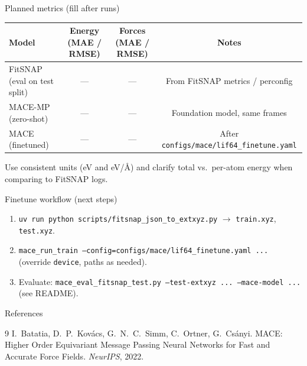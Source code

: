 \documentclass[aspectratio=169]{beamer}
\begin{document}
\begin{frame}{Planned metrics (fill after runs)}
  \begin{table}
    \centering
    \small
    \begin{tabular}{@{}lccc@{}}
      \toprule
      Model & Energy (MAE / RMSE) & Forces (MAE / RMSE) & Notes \\
      \midrule
      FitSNAP (eval on test split) & --- & --- & From FitSNAP metrics / perconfig \\
      MACE-MP (zero-shot) & --- & --- & Foundation model, same frames \\
      MACE (finetuned) & --- & --- & After \texttt{configs/mace/lif64\_finetune.yaml} \\
      \bottomrule
    \end{tabular}
  \end{table}
  \vfill
  \small
  Use consistent units (eV and eV/\AA{}) and clarify total vs.\ per-atom energy when comparing to FitSNAP logs.
\end{frame}

\begin{frame}{Finetune workflow (next steps)}
  \begin{enumerate}
    \item \texttt{uv run python scripts/fitsnap\_json\_to\_extxyz.py} $\to$ \texttt{train.xyz}, \texttt{test.xyz}.
    \item \texttt{mace\_run\_train --config=configs/mace/lif64\_finetune.yaml ...} (override \texttt{device}, paths as needed).
    \item Evaluate: \texttt{mace\_eval\_fitsnap\_test.py --test-extxyz ... --mace-model ...} (see README).
  \end{enumerate}
\end{frame}

\begin{frame}{References}
  \begin{thebibliography}{9}
    I.\ Batatia, D.\ P.\ Kov\'acs, G.\ N.\ C.\ Simm, C.\ Ortner, G.\ Cs\'anyi.
    \newblock MACE: Higher Order Equivariant Message Passing Neural Networks for Fast and Accurate Force Fields.
    \newblock \emph{NeurIPS}, 2022.
  \end{thebibliography}
\end{frame}
\end{document}

